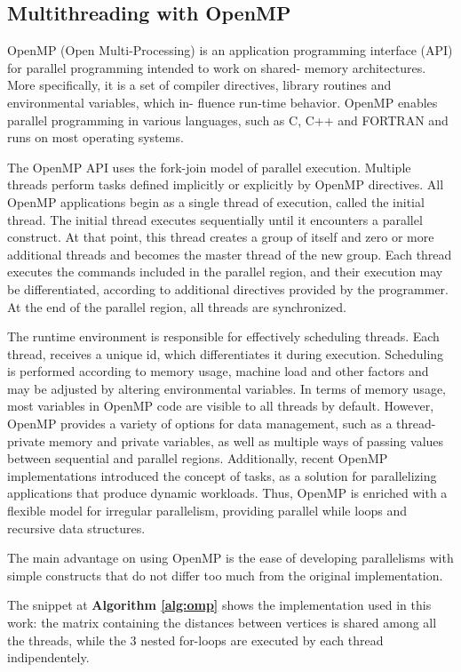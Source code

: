 \subsection{Multithreading with OpenMP}
OpenMP (Open Multi-Processing) is an application programming
interface (API) for parallel programming intended to work on shared-
memory architectures. More specifically, it is a set of compiler
directives, library routines and environmental variables, which in-
fluence run-time behavior. OpenMP enables parallel programming in
various languages, such as C, C++ and FORTRAN and runs on most
operating systems. \par
The OpenMP API uses the fork-join model of parallel execution.
Multiple threads perform tasks defined implicitly or explicitly by
OpenMP directives. All OpenMP applications begin as a single thread
of execution, called the initial thread. The initial thread executes
sequentially until it encounters a parallel construct. At that point,
this thread creates a group of itself and zero or more additional
threads and becomes the master thread of the new group. Each thread
executes the commands included in the parallel region, and their
execution may be differentiated, according to additional directives
provided by the programmer. At the end of the parallel region, all
threads are synchronized. \par
The runtime environment is responsible for effectively scheduling
threads. Each thread, receives a unique id, which differentiates it
during execution. Scheduling is performed according to memory
usage, machine load and other factors and may be adjusted by altering
environmental variables. In terms of memory usage, most variables in
OpenMP code are visible to all threads by default. However, OpenMP
provides a variety of options for data management, such as a thread-
private memory and private variables, as well as multiple ways of
passing values between sequential and parallel regions. Additionally,
recent OpenMP implementations introduced the concept of tasks,
as a solution for parallelizing applications that produce dynamic
workloads. Thus, OpenMP is enriched with a flexible model for
irregular parallelism, providing parallel while loops and recursive
data structures. \par
The main advantage on using OpenMP is the ease of developing parallelisms
with simple constructs that do not differ too much from the original implementation.

The snippet at \textbf{Algorithm \ref*{alg:omp}} shows the implementation used in this work: the matrix containing the
distances between vertices is shared among all the threads, while the 3 nested for-loops are executed
by each thread indipendentely.

